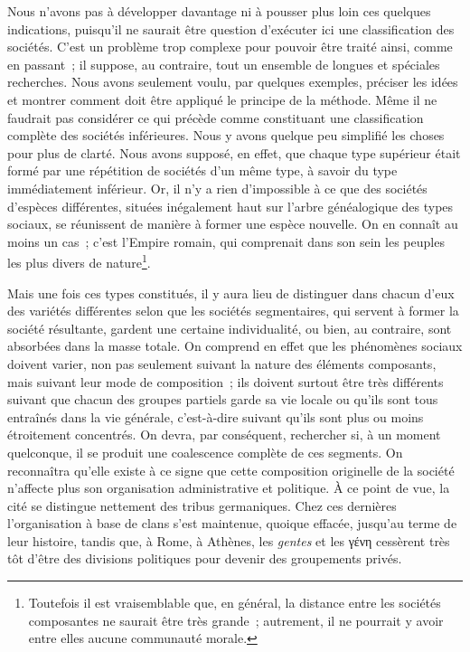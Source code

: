 \documentclass[french,twoside]{book} %
\begin{document}
Nous n’avons pas à développer davantage ni à pousser plus loin ces quelques indications, puisqu’il ne saurait être question d’exécuter ici une classification des sociétés. C’est un problème trop complexe pour pouvoir être traité ainsi, comme en passant ; il suppose, au contraire, tout un ensemble de longues et spéciales recherches. Nous avons seulement voulu, par quelques exemples, préciser les idées et montrer comment doit être appliqué le principe de la méthode. Même il ne faudrait pas considérer ce qui précède comme constituant une classification complète des sociétés inférieures. Nous y avons quelque peu simplifié les choses pour plus de clarté. Nous avons supposé, en effet, que chaque type supérieur était formé par une répétition de sociétés d’un même type, à savoir du type immédiatement inférieur. Or, il n’y a rien d’impossible à ce que des sociétés d’espèces différentes, situées inégalement haut sur l’arbre généalogique des types sociaux, se réunissent de manière à former une espèce nouvelle. On en connaît au moins un cas ; c’est l’Empire romain, qui comprenait dans son sein les peuples les plus divers de nature\footnote{ Toutefois il est vraisemblable que, en général, la distance entre les sociétés composantes ne saurait être très grande ; autrement, il ne pourrait y avoir entre elles aucune communauté morale.}.\par
Mais une fois ces types constitués, il y aura lieu de distinguer dans chacun d’eux des variétés différentes selon que les sociétés segmentaires, qui servent à former la société résultante, gardent une certaine individualité, ou bien, au contraire, sont absorbées dans la masse totale. On comprend en effet que les phénomènes sociaux doivent varier, non pas seulement suivant la nature des éléments composants, mais suivant leur mode de composition ; ils doivent surtout être très différents suivant que chacun des groupes partiels garde sa vie locale ou qu’ils sont tous entraînés dans la vie générale, c’est-à-dire suivant qu’ils sont plus ou moins étroitement concentrés. On devra, par conséquent, rechercher si, à un moment quelconque, il se produit une coalescence complète de ces segments. On reconnaîtra qu’elle existe à ce signe que cette composition originelle de la société n’affecte plus son organisation administrative et politique. À ce point de vue, la cité se distingue nettement des tribus germaniques. Chez ces dernières l’organisation à base de clans s’est maintenue, quoique effacée, jusqu’au terme de leur histoire, tandis que, à Rome, à Athènes, les {\itshape gentes} et les γένη cessèrent très tôt d’être des divisions politiques pour devenir des groupements privés.\par
\end{document}
